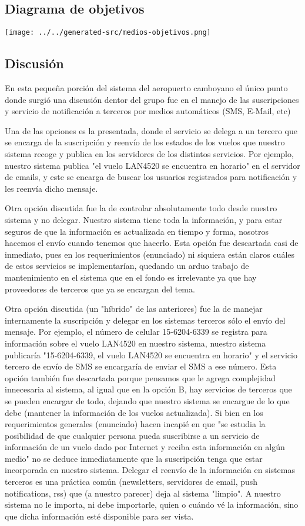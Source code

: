 \subsection{Diagrama de objetivos}
\texttt{[image: ../../generated-src/medios-objetivos.png]}

\subsection{Discusión}
En esta pequeña porción del sistema del aeropuerto camboyano el único punto donde surgió una discusión dentor del grupo fue en el manejo de las suscripciones y servicio de notificación a terceros por medios automáticos (SMS, E-Mail, etc)

Una de las opciones es la presentada, donde el servicio se delega a un tercero que se encarga de la suscripción y reenvío de los estados de los vuelos que nuestro sistema recoge y publica en los servidores de los distintos servicios. Por ejemplo, nuestro sistema publica "el vuelo LAN4520 se encuentra en horario" en el servidor de emails, y este se encarga de buscar los usuarios registrados para notificación y les reenvía dicho mensaje.

Otra opción discutida fue la de controlar absolutamente todo desde nuestro sistema y no delegar. Nuestro sistema tiene toda la información, y para estar seguros de que la información es actualizada en tiempo y forma, nosotros hacemos el envío cuando tenemos que hacerlo. Esta opción fue descartada casi de inmediato, pues en los requerimientos (enunciado) ni siquiera están claros cuáles de estos servicios se implementarían, quedando un arduo trabajo de mantenimiento en el sistema que en el fondo es irrelevante ya que hay proveedores de terceros que ya se encargan del tema.

Otra opción discutida (un "híbrido" de las anteriores) fue la de manejar internamente la suscripción y delegar en los sistemas terceros sólo el envío del mensaje. Por ejemplo, el número de celular 15-6204-6339 se registra para información sobre el vuelo LAN4520 en nuestro sistema, nuestro sistema publicaría "15-6204-6339, el vuelo LAN4520 se encuentra en horario" y el servicio tercero de envío de SMS se encargaría de enviar el SMS a ese número. Esta opción también fue descartada porque pensamos que le agrega complejidad innecesaria al sistema, al igual que en la opción B, hay servicios de terceros que se pueden encargar de todo, dejando que nuestro sistema se encargue de lo que debe (mantener la información de los vuelos actualizada). Si bien en los requerimientos generales (enunciado) hacen incapié en que "se estudia la posibilidad de que cualquier persona pueda suscribirse a un servicio de información de un vuelo dado por Internet y reciba esta información en algún medio" no se deduce inmediatamente que la suscripción tenga que estar incorporada en nuestro sistema. Delegar el reenvío de la información en sistemas terceros es una práctica común (newsletters, servidores de email, push notifications, rss) que (a nuestro parecer) deja al sistema "limpio". A nuestro sistema no le importa, ni debe importarle, quien o cuándo vé la información, sino que dicha información esté disponible para ser vista.
